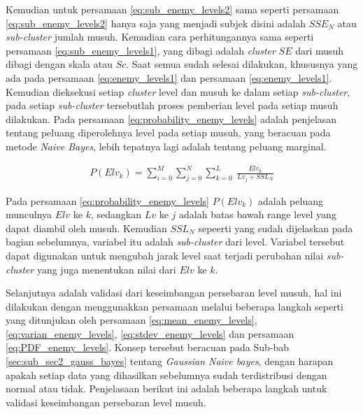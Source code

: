 Kemudian untuk persamaan \ref{eq:sub_enemy_levels2} sama seperti persamaan \ref{eq:sub_enemy_levels2} hanya saja yang menjadi subjek disini adalah $SSE_{N}$ atau \textit{sub-cluster} jumlah musuh. Kemudian cara perhitungannya sama seperti persamaan \ref{eq:sub_enemy_levels1}, yang dibagi adalah \textit{cluster} $SE$ dari musuh dibagi dengan skala atau $Sc$. Saat semua sudah selesai dilakukan, khususnya yang ada pada persamaan \ref{eq:enemy_levels1} dan persamaan \ref{eq:enemy_levels1}. Kemudian dieksekusi setiap \textit{cluster} level dan musuh ke dalam setiap \textit{sub-cluster}, pada setiap \textit{sub-cluster} tersebutlah proses pemberian level pada setiap musuh dilakukan. Pada persamaan \ref{eq:probability_enemy_levels} adalah penjelasan tentang peluang diperolehnya level pada setiap musuh, yang beracuan pada metode \textit{Naive Bayes}, lebih tepatnya lagi adalah tentang peluang marginal.
\vspace{1ex}

\begin{equation}\label{eq:probability_enemy_levels}
\begin{split}
P(Elv_{k}) = \sum_{i = 0}^{M} \sum_{j = 0}^{N} \sum_{k = 0}^{L}\ \frac{Elv_{k}}{Lv_{j} + SSL_{N}}
\end{split}
\end{equation}

Pada persamaan \ref{eq:probability_enemy_levels} $P(Elv_{k})$ adalah peluang munculnya $Elv$ ke $k$, sedangkan $Lv$ ke $j$ adalah batas bawah range level yang dapat diambil oleh musuh. Kemudian $SSL_{N}$ sepeerti yang sudah dijelaskan pada bagian sebelumnya, variabel itu adalah \textit{sub-cluster} dari level. Variabel tersebut dapat digunakan untuk mengubah jarak level saat terjadi perubahan nilai \textit{sub-cluster} yang juga menentukan nilai dari $Elv$ ke $k$.
\vspace{1ex}

Selanjutnya adalah validasi dari keseimbangan persebaran level musuh, hal ini dilakukan dengan menggunakkan persamaan melalui beberapa langkah seperti yang ditunjukan oleh persamaan \ref{eq:mean_enemy_levels}, \ref{eq:varian_enemy_levels}, \ref{eq:stdev_enemy_levels} dan persamaan \ref{eq:PDF_enemy_levels}. Konsep tersebut beracuan pada Sub-bab \ref{sec:sub_sec2_gauss_bayes} tentang \textit{Gaussian Naive bayes}, dengan harapan apakah setiap data yang dihasilkan sebelumnya sudah terdistribusi dengan normal atau tidak. Penjelasaan berikut ini adalah beberapa langkah untuk validasi keseimbangan persebaran level musuh.
\vspace{1ex}

